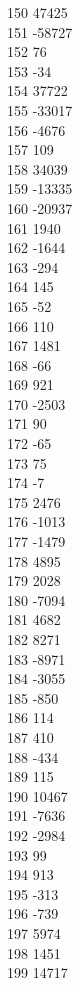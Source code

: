 { 150	47425 \\
 151	-58727 \\
 152	76 \\
 153	-34 \\
 154	37722 \\
 155	-33017 \\
 156	-4676 \\
 157	109 \\
 158	34039 \\
 159	-13335 \\
 160	-20937 \\
 161	1940 \\
 162	-1644 \\
 163	-294 \\
 164	145 \\
 165	-52 \\
 166	110 \\
 167	1481 \\
 168	-66 \\
 169	921 \\
 170	-2503 \\
 171	90 \\
 172	-65 \\
 173	75 \\
 174	-7 \\
 175	2476 \\
 176	-1013 \\
 177	-1479 \\
 178	4895 \\
 179	2028 \\
 180	-7094 \\
 181	4682 \\
 182	8271 \\
 183	-8971 \\
 184	-3055 \\
 185	-850 \\
 186	114 \\
 187	410 \\
 188	-434 \\
 189	115 \\
 190	10467 \\
 191	-7636 \\
 192	-2984 \\
 193	99 \\
 194	913 \\
 195	-313 \\
 196	-739 \\
 197	5974 \\
 198	1451 \\
 199	14717 \\
}
